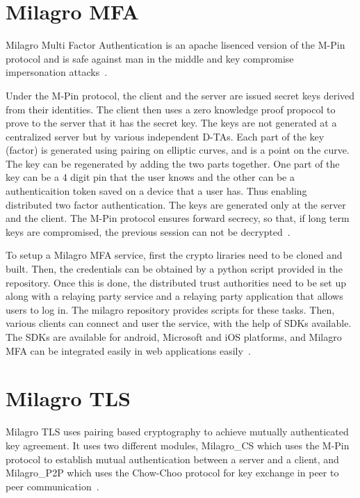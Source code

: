 \section{Milagro MFA}

Milagro Multi Factor Authentication is an apache lisenced version of
the M-Pin protocol and is safe against man in the middle and key
compromise impersonation attacks~\cite{milagro-mfa}.

Under the M-Pin protocol, the client and the server are issued secret
keys derived from their identities. The client then uses a zero
knowledge proof propocol to prove to the server that it has the secret
key. The keys are not generated at a centralized server but by various
independent D-TAs. Each part of the key (factor) is generated using
pairing on elliptic curves, and is a point on the curve. The key can
be regenerated by adding the two parts together. One part of the key
can be a 4 digit pin that the user knows and the other can be a
authenticaition token saved on a device that a user has. Thus enabling
distributed two factor authentication. The keys are generated only at
the server and the client. The M-Pin protocol ensures forward secrecy,
so that, if long term keys are compromised, the previous session can
not be decrypted~\cite{milagro-protocols}.


To setup a Milagro MFA service, first the crypto liraries need to be
cloned and built. Then, the credentials can be obtained by a python
script provided in the repository.  Once this is done, the distributed
trust authorities need to be set up along with a relaying party
service and a relaying party application that allows users to log
in. The milagro repository provides scripts for these tasks. Then,
various clients can connect and user the service, with the help of
SDKs available. The SDKs are available for android, Microsoft and iOS
platforms, and Milagro MFA can be integrated easily in web
applications easily~\cite{mfa-install}.


\section{Milagro TLS}

Milagro TLS uses pairing based cryptography to achieve mutually
authenticated key agreement. It uses two different modules,
Milagro\_CS which uses the M-Pin protocol to establish mutual
authentication between a server and a client, and Milagro\_P2P which
uses the Chow-Choo protocol for key exchange in peer to peer
communication~\cite{mtls-white-paper}.


